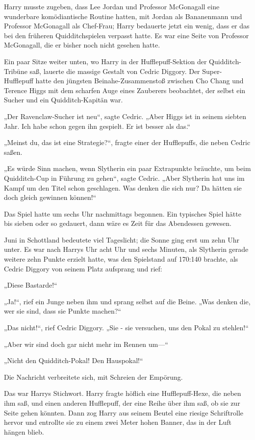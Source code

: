 {Harry musste zugeben, dass Lee Jordan und Professor McGonagall eine wunderbare komödiantische Routine hatten, mit Jordan als Bananenmann und Professor McGonagall als Chef-Frau; Harry bedauerte jetzt ein wenig, dass er das bei den früheren Quidditchspielen verpasst hatte. Es war eine Seite von Professor McGonagall, die er bisher noch nicht gesehen hatte.

Ein paar Sitze weiter unten, wo Harry in der Hufflepuff-Sektion der Quidditch-Tribüne saß, lauerte die massige Gestalt von Cedric Diggory. Der Super-Hufflepuff hatte den jüngsten Beinahe-Zusammenstoß zwischen Cho Chang und Terence Higgs mit dem scharfen Auge eines Zauberers beobachtet, der selbst ein Sucher und ein Quidditch-Kapitän war.

„Der Ravenclaw-Sucher ist neu“, sagte Cedric. „Aber Higgs ist in seinem siebten Jahr. Ich habe schon gegen ihn gespielt. Er ist besser als das.“

„Meinst du, das ist eine Strategie?“, fragte einer der Hufflepuffs, die neben Cedric saßen.

„Es würde Sinn machen, wenn Slytherin ein paar Extrapunkte bräuchte, um beim Quidditch-Cup in Führung zu gehen“, sagte Cedric. „Aber Slytherin hat uns im Kampf um den Titel schon geschlagen. Was denken die sich nur? Da hätten sie doch gleich gewinnen können!“

Das Spiel hatte um sechs Uhr nachmittags begonnen. Ein typisches Spiel hätte bis sieben oder so gedauert, dann wäre es Zeit für das Abendessen gewesen.

Juni in Schottland bedeutete viel Tageslicht; die Sonne ging erst um zehn Uhr unter. Es war nach Harrys Uhr acht Uhr und sechs Minuten, als Slytherin gerade weitere zehn Punkte erzielt hatte, was den Spielstand auf 170:140 brachte, als Cedric Diggory von seinem Platz aufsprang und rief:

„Diese Bastarde!“

„Ja!“, rief ein Junge neben ihm und sprang selbst auf die Beine. „Was denken die, wer sie sind, dass sie Punkte machen?“

„Das nicht!“, rief Cedric Diggory. „Sie - sie versuchen, uns den Pokal zu stehlen!“

„Aber wir sind doch gar nicht mehr im Rennen um—“

„Nicht den Quidditch-Pokal! Den Hauspokal!“

Die Nachricht verbreitete sich, mit Schreien der Empörung.

Das war Harrys Stichwort. Harry fragte höflich eine Hufflepuff-Hexe, die neben ihm saß, und einen anderen Hufflepuff, der eine Reihe über ihm saß, ob sie zur Seite gehen könnten. Dann zog Harry aus seinem Beutel eine riesige Schriftrolle hervor und entrollte sie zu einem zwei Meter hohen Banner, das in der Luft hängen blieb.

}

